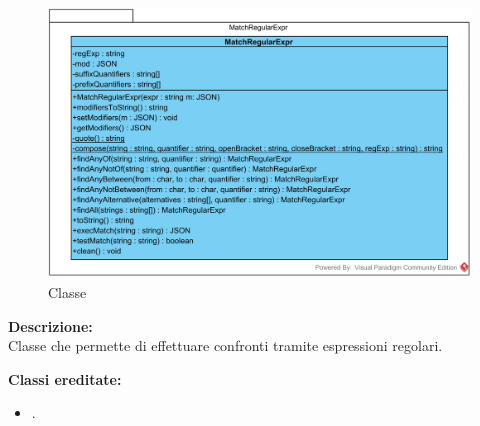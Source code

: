 


%
%

\subparagraph[::MatchRegularExpr::MatchRegularExpr]{\class}\mbox{}\\ \label{\class}
\begin{figure}[H]
	\centering
	\includegraphics[width=15cm]{./diagrammi/framework/model/api/matchregularexpr.png}
	\caption{Classe \class}
\end{figure}

\textbf{Descrizione:}\\
Classe che permette di effettuare confronti tramite espressioni regolari.


\textbf{Classi ereditate:}
\begin{itemize}
	\item {}.
\end{itemize}

